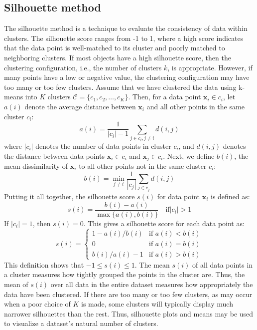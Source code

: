 \documentclass{article}[11pt]
\begin{document}
\subsection{Silhouette method}
The silhouette method is a technique to evaluate the consistency of data within clusters.
The silhouette score ranges from -1 to 1, where a high score indicates that the data point is well-matched to its cluster and poorly matched to neighboring clusters.
If most objects have a high silhouette score, then the clustering configuration, i.e., the number of clusters $k$, is appropriate. 
However, if many points have a low or negative value, the clustering configuration may have too many or too few clusters.
Assume that we have clustered the data using k-means into $K$ clusters $\mathcal{C} = \{c_1, c_2, \ldots, c_K\}$.
Then, for a data point $\mathbf{x}_i\in c_i$, let $a(i)$ denote the average distance between $\mathbf{x}_i$ and all other points in the same cluster $c_i$:
\begin{equation}
a(i) = \frac{1}{|c_i| - 1}\sum_{j\in c_i, j\neq i}d(i,j)
\end{equation}
where $|c_i|$ denotes the number of data points in cluster $c_i$, and $d(i,j)$ denotes the distance between data points $\mathbf{x}_i\in{c_{i}}$ and $\mathbf{x}_j\in{c_{i}}$.
Next, we define $b(i)$, the mean dissimilarity of $\mathbf{x}_i$ to all other points not in the same cluster $c_i$:
\begin{equation}
b(i) = \min_{j\neq i}\frac{1}{|c_j|}\sum_{j\in c_j}d(i,j)
\end{equation}
Putting it all together, the silhouette score $s(i)$ for data point $\mathbf{x}_i$ is defined as:
\begin{equation}
s(i) = \frac{b(i) - a(i)}{\max\{a(i), b(i)\}}\quad\text{if}|c_i|>1
\end{equation}
If $|c_i|=1$, then $s(i)=0$. This gives a silhouette score for each data point as:
\begin{equation}
   s(i) =
   \begin{cases}
      1 - a(i)/b(i) & \text{if } a(i) < b(i)\\ 
      0 & \text{if } a(i) = b(i)\\
      b(i)/a(i) - 1 & \text{if } a(i) > b(i)
   \end{cases}
\end{equation}
This definition shows that $-1\leq s(i)\leq 1$. 
The mean $s(i)$ of all data points in a cluster measures how tightly grouped the points in the cluster are.
Thus, the mean of $s(i)$ over all data in the entire dataset measures how appropriately the data have been clustered.
If there are too many or too few clusters, as may occur when a poor choice of $K$ is made, some clusters will typically display much narrower silhouettes than the rest. 
Thus, silhouette plots and means may be used to visualize a dataset's natural number of clusters.
\end{document}
